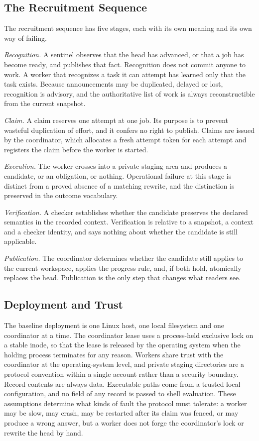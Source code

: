 \documentclass[11pt,a4paper]{article}
\theoremstyle{plain}
\theoremstyle{definition}
\theoremstyle{remark}
\theoremstyle{definition}
\begin{document}
\subsection{The Recruitment Sequence}

The recruitment sequence has five stages, each with its own meaning and its own way of failing.

\emph{Recognition.} A sentinel observes that the head has advanced, or that a job has become ready, and publishes that fact. Recognition does not commit anyone to work. A worker that recognizes a task it can attempt has learned only that the task exists. Because announcements may be duplicated, delayed or lost, recognition is advisory, and the authoritative list of work is always reconstructible from the current snapshot.

\emph{Claim.} A claim reserves one attempt at one job. Its purpose is to prevent wasteful duplication of effort, and it confers no right to publish. Claims are issued by the coordinator, which allocates a fresh attempt token for each attempt and registers the claim before the worker is started.

\emph{Execution.} The worker crosses into a private staging area and produces a candidate, or an obligation, or nothing. Operational failure at this stage is distinct from a proved absence of a matching rewrite, and the distinction is preserved in the outcome vocabulary.

\emph{Verification.} A checker establishes whether the candidate preserves the declared semantics in the recorded context. Verification is relative to a snapshot, a context and a checker identity, and says nothing about whether the candidate is still applicable.

\emph{Publication.} The coordinator determines whether the candidate still applies to the current workspace, applies the progress rule, and, if both hold, atomically replaces the head. Publication is the only step that changes what readers see.

\subsection{Deployment and Trust}

The baseline deployment is one Linux host, one local filesystem and one coordinator at a time. The coordinator lease uses a process-held exclusive lock on a stable inode, so that the lease is released by the operating system when the holding process terminates for any reason. Workers share trust with the coordinator at the operating-system level, and private staging directories are a protocol convention within a single account rather than a security boundary. Record contents are always data. Executable paths come from a trusted local configuration, and no field of any record is passed to shell evaluation. These assumptions determine what kinds of fault the protocol must tolerate: a worker may be slow, may crash, may be restarted after its claim was fenced, or may produce a wrong answer, but a worker does not forge the coordinator's lock or rewrite the head by hand.
\end{document}
